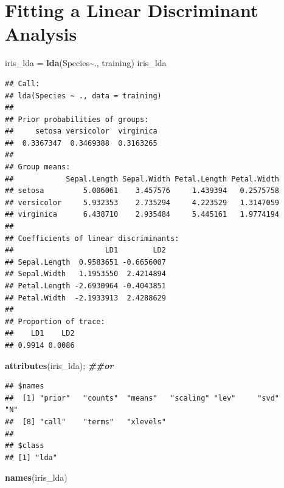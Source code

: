 \documentclass[
]{article}
\newenvironment{Shaded}{\begin{snugshade}}{\end{snugshade}}
\newcommand{\DocumentationTok}[1]{\textcolor[rgb]{0.56,0.35,0.01}{\textbf{\textit{#1}}}}
\newcommand{\FunctionTok}[1]{\textcolor[rgb]{0.13,0.29,0.53}{\textbf{#1}}}
\newcommand{\NormalTok}[1]{#1}
\newcommand{\OtherTok}[1]{\textcolor[rgb]{0.56,0.35,0.01}{#1}}
\newcommand{\SpecialCharTok}[1]{\textcolor[rgb]{0.81,0.36,0.00}{\textbf{#1}}}
\begin{document}
\hypertarget{fitting-a-linear-discriminant-analysis}{%
\section{Fitting a Linear Discriminant
Analysis}\label{fitting-a-linear-discriminant-analysis}}

\begin{Shaded}
\begin{Highlighting}[]
\NormalTok{iris\_lda }\OtherTok{=} \FunctionTok{lda}\NormalTok{(Species}\SpecialCharTok{\textasciitilde{}}\NormalTok{., training)}
\NormalTok{iris\_lda}
\end{Highlighting}
\end{Shaded}

\begin{verbatim}
## Call:
## lda(Species ~ ., data = training)
## 
## Prior probabilities of groups:
##     setosa versicolor  virginica 
##  0.3367347  0.3469388  0.3163265 
## 
## Group means:
##            Sepal.Length Sepal.Width Petal.Length Petal.Width
## setosa         5.006061    3.457576     1.439394   0.2575758
## versicolor     5.932353    2.735294     4.223529   1.3147059
## virginica      6.438710    2.935484     5.445161   1.9774194
## 
## Coefficients of linear discriminants:
##                     LD1        LD2
## Sepal.Length  0.9583651 -0.6656007
## Sepal.Width   1.1953550  2.4214894
## Petal.Length -2.6930964 -0.4043851
## Petal.Width  -2.1933913  2.4288629
## 
## Proportion of trace:
##    LD1    LD2 
## 0.9914 0.0086
\end{verbatim}

\begin{Shaded}
\begin{Highlighting}[]
\FunctionTok{attributes}\NormalTok{(iris\_lda); }\DocumentationTok{\#\#or }
\end{Highlighting}
\end{Shaded}

\begin{verbatim}
## $names
##  [1] "prior"   "counts"  "means"   "scaling" "lev"     "svd"     "N"      
##  [8] "call"    "terms"   "xlevels"
## 
## $class
## [1] "lda"
\end{verbatim}

\begin{Shaded}
\begin{Highlighting}[]
\FunctionTok{names}\NormalTok{(iris\_lda)}
\end{Highlighting}
\end{Shaded}
\end{document}
